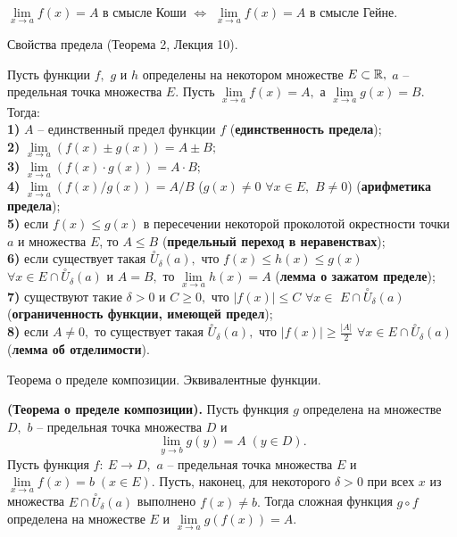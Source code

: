 \begin{theorem}
	$\lim\limits_{x\rightarrow a}f(x)=A$ в смысле Коши
	$\Leftrightarrow$
	$\lim\limits_{x\rightarrow a}f(x)=A$ в смысле Гейне.
\end{theorem}

\newpage
\begin{problem}
Свойства предела (Теорема 2, Лекция 10).
\end{problem}

\begin{theorem} Пусть функции $f,$ $g$ и $h$
	определены на некотором множестве $E\subset\mathbb{R},$
	$a$ -- предельная точка множества $E.$
	Пусть $\lim\limits_{x\rightarrow a}f(x)=A,$ а
	$\lim\limits_{x\rightarrow a}g(x)=B$. Тогда:\\
	\textbf{1)} $A$ -- единственный предел функции $f$
	(\textbf{единственность предела});\\
	\textbf{2)} $\lim\limits_{x\rightarrow a}(f(x)\pm g(x))=A\pm B;$\\
	\textbf{3)} $\lim\limits_{x\rightarrow a}(f(x)\cdot g(x))=A\cdot B;$\\
	\textbf{4)} $\lim\limits_{x\rightarrow a}(f(x)/g(x))=A/B$
	($g(x)\neq0$ $\forall x \in E,$ $B\neq0$)
	(\textbf{арифметика предела});\\
	\textbf{5)} если $f(x)\leq g(x)$ в пересечении некоторой
	проколотой окрестности точки $a$ и множества $E$, то $A\leq B$
	(\textbf{предельный переход в неравенствах});\\
	\textbf{6)} если существует такая
	$\stackrel{\circ}{U}_{\delta}(a),$ что
	$f(x)\leq h(x)\leq g(x)$ $\forall
		x\in E\cap\stackrel{\circ}{U}_{\delta}(a)$
	и $A=B,$ то
	$\lim\limits_{x\rightarrow a}h(x)=A$
	(\textbf{лемма о зажатом пределе});\\
	\textbf{7)} существуют такие $\delta>0$
	и $C\geq0,$ что
	$|f(x)|\leq C$ $\forall x\in$
	$E\cap\stackrel{\circ}{U}_{\delta}(a)$
	(\textbf{ограниченность функции, имеющей предел});\\
	\textbf{8)} если $A\neq0,$ то существует такая
	$\stackrel{\circ}{U}_{\delta}(a),$ что
	$|f(x)|\geq\frac{|A|}{2}$ $\forall x\in
		E\cap\stackrel{\circ}{U}_{\delta}(a)$
	(\textbf{лемма об отделимости}).
\end{theorem}

\newpage
\begin{problem}
Теорема о пределе композиции. Эквивалентные функции.
\end{problem}

\begin{theorem} \textbf{(Теорема о пределе композиции).}
	Пусть функция $g$ определена на множестве $D,$
	$b$ -- предельная точка множества $D$ и
	$$
		\lim\limits_{y\rightarrow b}g(y)=A\;(y\in D).
	$$
	Пусть функция $f: \ E\rightarrow D,$
	$a$ -- предельная точка множества $E$ и
	$\lim\limits_{x\rightarrow a}f(x)=b\;(x\in E).$
	Пусть, наконец, для некоторого $\delta>0$
	при всех $x$ из множества
	$E\cap\stackrel{\circ}{U}_{\delta}(a)$
	выполнено $f(x)\neq b.$
	Тогда сложная функция $g\circ f$ определена
	на множестве $E$ и
	$\lim\limits_{x\rightarrow a}g(f(x))=A.$
\end{theorem}

